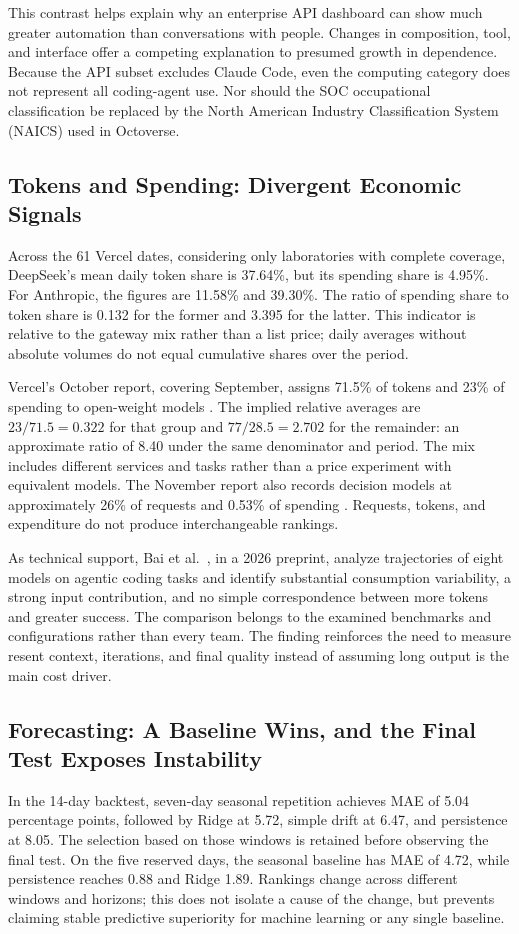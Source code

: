 \documentclass[11pt,a4paper]{article}
\begin{document}
This contrast helps explain why an enterprise API dashboard can show much greater automation than conversations with people. Changes in composition, tool, and interface offer a competing explanation to presumed growth in dependence. Because the API subset excludes Claude Code, even the computing category does not represent all coding-agent use. Nor should the SOC occupational classification be replaced by the North American Industry Classification System (NAICS) used in Octoverse.

\subsection{Tokens and Spending: Divergent Economic Signals}
Across the 61 Vercel dates, considering only laboratories with complete coverage, DeepSeek's mean daily token share is 37.64\%, but its spending share is 4.95\%. For Anthropic, the figures are 11.58\% and 39.30\%. The ratio of spending share to token share is 0.132 for the former and 3.395 for the latter. This indicator is relative to the gateway mix rather than a list price; daily averages without absolute volumes do not equal cumulative shares over the period.

Vercel's October report, covering September, assigns 71.5\% of tokens and 23\% of spending to open-weight models \cite{verceloctober}. The implied relative averages are $23/71.5=0.322$ for that group and $77/28.5=2.702$ for the remainder: an approximate ratio of 8.40 under the same denominator and period. The mix includes different services and tasks rather than a price experiment with equivalent models. The November report also records decision models at approximately 26\% of requests and 0.53\% of spending \cite{vercelnovember}. Requests, tokens, and expenditure do not produce interchangeable rankings.

As technical support, Bai et al.\ \cite{bai2026}, in a 2026 preprint, analyze trajectories of eight models on agentic coding tasks and identify substantial consumption variability, a strong input contribution, and no simple correspondence between more tokens and greater success. The comparison belongs to the examined benchmarks and configurations rather than every team. The finding reinforces the need to measure resent context, iterations, and final quality instead of assuming long output is the main cost driver.

\subsection{Forecasting: A Baseline Wins, and the Final Test Exposes Instability}
In the 14-day backtest, seven-day seasonal repetition achieves MAE of 5.04 percentage points, followed by Ridge at 5.72, simple drift at 6.47, and persistence at 8.05. The selection based on those windows is retained before observing the final test. On the five reserved days, the seasonal baseline has MAE of 4.72, while persistence reaches 0.88 and Ridge 1.89. Rankings change across different windows and horizons; this does not isolate a cause of the change, but prevents claiming stable predictive superiority for machine learning or any single baseline.
\end{document}
